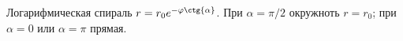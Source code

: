 Логарифмическая спираль $r = r_0e^{-\varphi \ctg{\alpha}}$.
При $\alpha = \pi/2$ окружноть $r = r_0$; при $\alpha = 0$
или $\alpha = \pi$ прямая.
